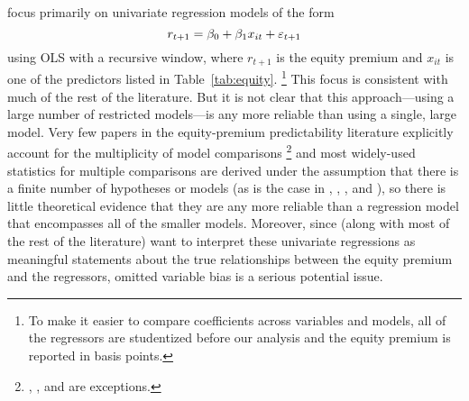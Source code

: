 \documentclass[12pt]{article}
\begin{document}
\citet{GoW:08} focus primarily on univariate regression models of the
form
\[
r_{t+1} = \beta_0 + \beta_1 x_{it} + \varepsilon_{t+1}
\]
using OLS with a recursive window, where $r_{t+1}$ is the equity
premium and $x_{it}$ is one of the predictors listed in
Table~\ref{tab:equity}.%
\footnote{To make it easier to compare coefficients across variables
  and models, all of the regressors are studentized before our
  analysis and the equity premium is reported in basis points.} %
This focus is consistent with much of the rest of the literature. But
it is not clear that this approach---using a large number of
restricted models---is any more reliable than using a single, large
model. Very few papers in the equity-premium predictability literature
explicitly account for the multiplicity of model comparisons%
\footnote{\citet{RaW:06}, \citet{RaZ:12}, and \citet{Cal:13b} are
  exceptions.} %
and most widely-used statistics for multiple comparisons are
derived under the assumption that there is a finite number of
hypotheses or models (as is the case in \citealp{STW:99c},
\citealp{Whi:00}, \citealp{Han:05}, and \citealp{LeR:05}), so there is
little theoretical evidence that they are any more reliable than a
regression model that encompasses all of the smaller models. Moreover,
since \citet{GoW:08} (along with most of the rest of the literature)
want to interpret these univariate regressions as meaningful
statements about the true relationships between the equity premium and
the regressors, omitted variable bias is a serious potential issue.
\end{document}
